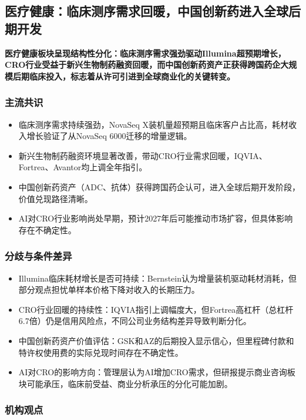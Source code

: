 \documentclass[11pt]{ctexart}
\begin{document}
\subsection{医疗健康：临床测序需求回暖，中国创新药进入全球后期开发}
\textbf{医疗健康板块呈现结构性分化：临床测序需求强劲驱动Illumina超预期增长，CRO行业受益于新兴生物制药融资回暖，而中国创新药资产正获得跨国药企大规模后期临床投入，标志着从许可引进到全球商业化的关键转变。}
\subsubsection*{主流共识}
\begin{itemize}
  \item 临床测序需求持续强劲，NovaSeq X装机量超预期且临床客户占比高，耗材收入增长验证了从NovaSeq 6000迁移的增量逻辑。
  \item 新兴生物制药融资环境显著改善，带动CRO行业需求回暖，IQVIA、Fortrea、Avantor均上调全年指引。
  \item 中国创新药资产（ADC、抗体）获得跨国药企认可，进入全球后期开发阶段，价值兑现路径清晰。
  \item AI对CRO行业影响尚处早期，预计2027年后可能推动市场扩容，但具体影响存在不确定性。
\end{itemize}
\subsubsection*{分歧与条件差异}
\begin{itemize}
  \item Illumina临床耗材增长是否可持续：Bernstein认为增量装机驱动耗材消耗，但部分观点担忧单样本价格下降对收入的长期压力。
  \item CRO行业回暖的持续性：IQVIA指引上调幅度大，但Fortrea高杠杆（总杠杆6.7倍）仍是信用风险点，不同公司业务结构差异导致判断分化。
  \item 中国创新药资产价值评估：GSK和AZ的后期投入显示信心，但里程碑付款和特许权使用费的实际兑现时间存在不确定性。
  \item AI对CRO的影响方向：管理层认为AI增加CRO需求，但研报提示商业咨询板块可能承压，临床前受益、商业分析承压的分化可能加剧。
\end{itemize}
\subsubsection*{机构观点}
\end{document}
